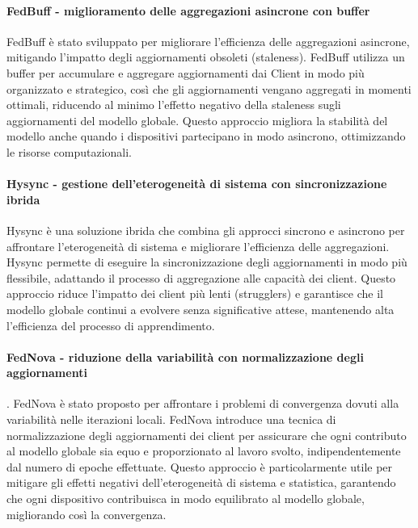 \documentclass[a4paper, oneside, openright]{report}
\begin{document}
\paragraph{FedBuff - miglioramento delle aggregazioni asincrone con buffer}
FedBuff \cite{DBLP:journals/corr/abs-2106-06639} è stato sviluppato per migliorare l'efficienza delle aggregazioni asincrone, mitigando l'impatto degli aggiornamenti obsoleti (staleness). FedBuff utilizza un buffer per accumulare e aggregare aggiornamenti dai 
Client in modo più organizzato e strategico, così che gli aggiornamenti vengano aggregati in momenti ottimali, riducendo al minimo l'effetto negativo della staleness sugli aggiornamenti del modello globale. Questo approccio migliora la stabilità del modello anche quando i dispositivi partecipano in modo asincrono, ottimizzando le risorse computazionali.


\paragraph{Hysync - gestione dell'eterogeneità di sistema con sincronizzazione ibrida}\label{fedopt:hysync}
Hysync \cite{9407951} è una soluzione ibrida che combina gli approcci sincrono e asincrono per affrontare l'eterogeneità di sistema e migliorare l'efficienza delle aggregazioni. Hysync permette di eseguire la sincronizzazione degli aggiornamenti in modo più flessibile, adattando il processo di aggregazione alle capacità dei client. Questo approccio riduce l'impatto dei client più lenti (strugglers) e garantisce che il modello globale continui a evolvere senza significative attese, mantenendo alta l'efficienza del processo di apprendimento.

\paragraph{FedNova - riduzione della variabilità con normalizzazione degli aggiornamenti}.
FedNova \cite{DBLP:journals/corr/abs-2007-07481} è stato proposto per affrontare i problemi di convergenza dovuti alla variabilità nelle iterazioni locali. FedNova introduce una tecnica di normalizzazione degli aggiornamenti dei client per assicurare che ogni contributo al modello globale sia equo e proporzionato al lavoro svolto, indipendentemente dal numero di epoche effettuate. Questo approccio è particolarmente utile per mitigare gli effetti negativi dell'eterogeneità di sistema e statistica, garantendo che ogni dispositivo contribuisca in modo equilibrato al modello globale, migliorando così la convergenza.
\end{document}
